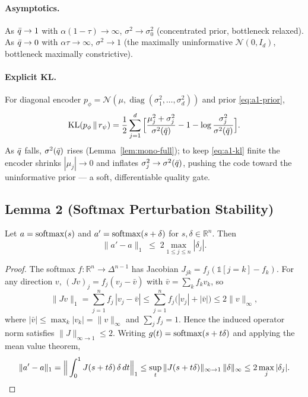 \paragraph{Asymptotics.}
As $\qbar\to 1$ with $\alpha(1-\tau)\to\infty$, $\sigma^2\to\sigma_0^2$ (concentrated prior, bottleneck
relaxed). As $\qbar\to 0$ with $\alpha\tau\to\infty$, $\sigma^2\to 1$ (the maximally uninformative
$\mathcal{N}(0,I_d)$, bottleneck maximally constrictive).

\paragraph{Explicit KL.}
For diagonal encoder $p_\phi=\mathcal{N}(\mu,\operatorname{diag}(\sigma_1^2,\dots,\sigma_d^2))$ and prior
\eqref{eq:a1-prior},
\begin{equation}
\KL(p_\phi\,\|\,r_\psi)
= \frac{1}{2}\sum_{j=1}^{d}\Big[\frac{\mu_j^2+\sigma_j^2}{\sigma^2(\qbar)} - 1
- \log\frac{\sigma_j^2}{\sigma^2(\qbar)}\Big].
\label{eq:a1-kl}
\end{equation}
As $\qbar$ falls, $\sigma^2(\qbar)$ rises (Lemma~\ref{lem:mono-full}); to keep \eqref{eq:a1-kl}
finite the encoder shrinks $|\mu_j|\to 0$ and inflates $\sigma_j^2\to\sigma^2(\qbar)$, pushing the
code toward the uninformative prior --- a soft, differentiable quality gate.

\subsection{Lemma 2 (Softmax Perturbation Stability)}\label{app:a1-lemma2}

\begin{lemma}\label{lem:softmax}
Let $a=\softmax(s)$ and $a'=\softmax(s+\delta)$ for $s,\delta\in\mathbb{R}^n$. Then
\begin{equation}
\|a'-a\|_1 \;\leq\; 2\max_{1\leq j\leq n}|\delta_j|.
\label{eq:a1-softmax}
\end{equation}
\end{lemma}

\begin{proof}
The softmax $f:\mathbb{R}^n\to\Delta^{n-1}$ has Jacobian $J_{jk}=f_j(\mathbb{1}[j=k]-f_k)$. For any
direction $v$, $(Jv)_j = f_j(v_j-\bar{v})$ with $\bar{v}=\sum_k f_k v_k$, so
\begin{equation}
\|Jv\|_1 = \sum_{j=1}^n f_j\,|v_j-\bar{v}|
\leq \sum_{j=1}^n f_j\big(|v_j|+|\bar{v}|\big)
\leq 2\|v\|_\infty,
\label{eq:a1-jac}
\end{equation}
where $|\bar{v}|\leq\max_k|v_k|=\|v\|_\infty$ and $\sum_j f_j=1$. Hence the induced operator norm
satisfies $\|J\|_{\infty\to 1}\leq 2$. Writing $g(t)=\softmax(s+t\delta)$ and applying the mean
value theorem,
\begin{equation}
\|a'-a\|_1 = \Big\|\int_0^1 J(s+t\delta)\,\delta\,dt\Big\|_1
\leq \sup_{t}\|J(s+t\delta)\|_{\infty\to 1}\,\|\delta\|_\infty
\leq 2\max_j|\delta_j|. \qedhere
\label{eq:a1-mvt}
\end{equation}
\end{proof}

